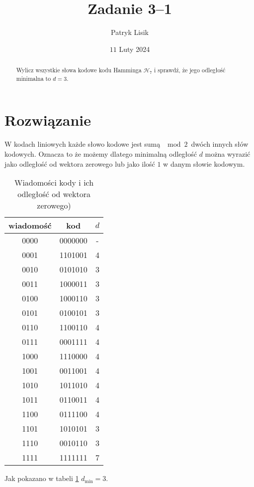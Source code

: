 \documentclass[12pt]{article}
\title{Zadanie 3--1}
\author{Patryk Lisik}
\date{\(11\) Luty  2024}
\begin{document}
\maketitle
\renewcommand{\abstractname}{Treść}

\begin{abstract}
    Wylicz wszystkie słowa kodowe kodu Hamminga $\mathcal{H}_7$ i sprawdź, że jego odległość minimalna to $ d=3 $.
\end{abstract}


\section*{Rozwiązanie}
W kodach liniowych każde słowo kodowe jest sumą $\mod 2$ dwóch innych słów kodowych. 
Oznacza to że możemy dlatego minimalną odległość $d$ można wyrazić jako odległość od wektora zerowego lub 
jako ilość $1$ w danym słowie kodowym.

\begin{table}[h]
    \centering
    \begin{tabular}{ccc}
        wiadomość & kod       & $d$ \\ \hline
        0000      & 0000000   &  - \\ 
        0001      & 1101001   &  4 \\ 
        0010      & 0101010   &  3 \\ 
        0011      & 1000011   &  3 \\ 
        0100      & 1000110   &  3 \\ 
        0101      & 0100101   &  3 \\ 
        0110      & 1100110   &  4 \\ 
        0111      & 0001111   &  4 \\ 
        1000      & 1110000   &  4 \\ 
        1001      & 0011001   &  4 \\ 
        1010      & 1011010   &  4 \\ 
        1011      & 0110011   &  4 \\ 
        1100      & 0111100   &  4 \\ 
        1101      & 1010101   &  3 \\ 
        1110      & 0010110   &  3 \\ 
        1111      & 1111111   &  7 \\ 
    \end{tabular}
    \caption{Wiadomości kody i ich odległość od wektora zerowego)}
    \label{tab}
\end{table}

Jak pokazano w tabeli \ref{tab} $d_{\min}=3$.
\end{document}

